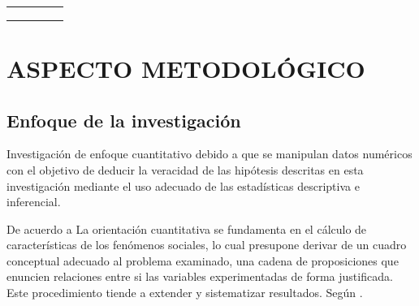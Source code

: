 \documentclass[12pt,a4paper]{article}
\begin{document}
\begin{table}[ht!]
\begin{tabular}{cllcc}
		                    &                                                   & \multirow{1}{*}{\fbbbbbbbbbbbbb}   &                                                                              &                                                                \\\cline{3-3}
		                    &                                                   & \multirow{1}{*}{\fbbbbbbbbbbbbbb}  &                                                                              &                                                                \\\cline{3-3}
		                    &                                                   & \multirow{1}{*}{\fbbbbbbbbbbbbbbb} &                                                                              &                                                                \\\bottomrule%
	\end{tabular}
	\vspace{0.5cm}
\end{table}


\section{ASPECTO METODOLÓGICO}

\subsection{Enfoque de la investigación}
Investigación de enfoque cuantitativo debido a que se manipulan datos numéricos con el objetivo de deducir la veracidad de las hipótesis descritas en esta investigación mediante el uso adecuado de las estadísticas descriptiva e inferencial.

De acuerdo a \cite{alzina_metodologiinvestigacion_2004} La orientación cuantitativa se fundamenta en el cálculo de características de los fenómenos sociales, lo cual presupone derivar de un cuadro conceptual adecuado al problema examinado, una cadena de proposiciones que enuncien relaciones entre si las variables experimentadas de forma justificada. Este procedimiento tiende a extender y sistematizar resultados. Según \cite{hernandez_sampieri_metodologiinvestigacion_2014}.
\end{document}
